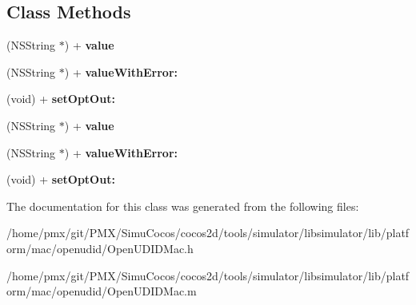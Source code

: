 \subsection*{Class Methods}
\begin{DoxyCompactItemize}
\item 
\mbox{\label{interfaceOpenUDIDMac_a0e406752b7b84bdfffb07fbd0c3b4704}} 
(N\+S\+String $\ast$) + {\bfseries value}
\item 
\mbox{\label{interfaceOpenUDIDMac_a53165f6c1f7f2014e7f86eb539c8a30d}} 
(N\+S\+String $\ast$) + {\bfseries value\+With\+Error\+:}
\item 
\mbox{\label{interfaceOpenUDIDMac_a150af4ffade3f8ecedf91102711c299b}} 
(void) + {\bfseries set\+Opt\+Out\+:}
\item 
\mbox{\label{interfaceOpenUDIDMac_a231ea30dc6647e7a59400037461f8d33}} 
(N\+S\+String $\ast$) + {\bfseries value}
\item 
\mbox{\label{interfaceOpenUDIDMac_a8dd37b242ed6059469c33e81fc7cdcae}} 
(N\+S\+String $\ast$) + {\bfseries value\+With\+Error\+:}
\item 
\mbox{\label{interfaceOpenUDIDMac_a150af4ffade3f8ecedf91102711c299b}} 
(void) + {\bfseries set\+Opt\+Out\+:}
\end{DoxyCompactItemize}


The documentation for this class was generated from the following files\+:\begin{DoxyCompactItemize}
\item 
/home/pmx/git/\+P\+M\+X/\+Simu\+Cocos/cocos2d/tools/simulator/libsimulator/lib/platform/mac/openudid/Open\+U\+D\+I\+D\+Mac.\+h\item 
/home/pmx/git/\+P\+M\+X/\+Simu\+Cocos/cocos2d/tools/simulator/libsimulator/lib/platform/mac/openudid/Open\+U\+D\+I\+D\+Mac.\+m\end{DoxyCompactItemize}
